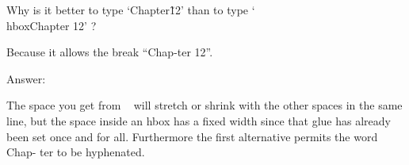 Why is it better to type ‘Chapter\~12’ than to type ‘\\hbox{Chapter 12}’ ?

Because it allows the break ``Chap-ter 12''.

Answer:

The space you get from ~ will stretch or shrink with the other spaces in the
same line, but the space inside an hbox has a fixed width since that glue has already
been set once and for all. Furthermore the first alternative permits the word Chap-
ter to be hyphenated.

\bye
